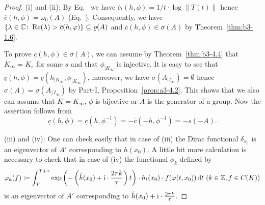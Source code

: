\begin{proof}	
	(i) and (ii): By Eq.~ we have $\overline{c}_{t}(h,\phi) = 1/t\cdot\log\|T(t)\|$ hence $\overline{c}(h,\phi) = \omega_{0}(A)$ (\cf Eq.~).  
	Consequently, we have $\{\lambda \in \C \colon \Re(\lambda) > \overline{c}(h,\phi)\} \subseteq \rho(A)$ and $\overline{c}(h,\phi) \in \sigma(A)$ by Theorem~\ref{thm:b3-1.6}.
	
	To prove $\underline{c}(h,\phi) \in \sigma(A)$, we can assume by Theorem~\ref{thm:b3-4.4} that $K_{\infty} = K_{s}$ for some $s$ and that $\phi_{|K_{\infty}}$ is injective.
	It is easy to see that $\underline{c}(h,\phi) = \underline{c}(h_{|K_{\infty}},\phi_{|K_{\infty}})$, moreover, we have $\sigma(A_{|I_{\infty}}) = \emptyset$ hence $\sigma(A) = \sigma(A_{/I_{\infty}})$ by Part-I, Proposition~\ref{prop:a3-4.2}.
	This shows that we also can assume that $K = K_{\infty}$, \ie $\phi$ is bijective or $A$ is the generator of a group.
	Now the assertion follows from 
    \[
    \underline{c}(h,\phi) = \underline{c}(h,\phi^{-1}) = -\overline{c}(-h,\phi^{-1}) = -s(-A) .
    \]
	
	(iii) and (iv): One can check easily that in case of (iii) the Dirac functional $\delta_{x_{0}}$ is an eigenvector of\/ $A'$ corresponding to $h(x_{0})$.
    A little bit more calculation is necessary to check that in case of (iv) the functional $\phi_{k}$ defined by
\[
	\phi_{k}(f) \coloneq \int_{T}^{T+\tau} \exp\left(-\left(\hat{h}(x_{0}) + \im\cdot\frac{2\pi k}{\tau}\right) t\right)\cdot h_{t}(x_{0})\cdot f(\phi(t,x_{0})) \dt  \ (k \in \Z, f \in C(K))
\]
    is an eigenvector of\/ $A'$ corresponding to $\hat{h}(x_{0}) + \mathrm{i}\cdot\frac{2\pi k}{\tau}$.


\end{proof}
